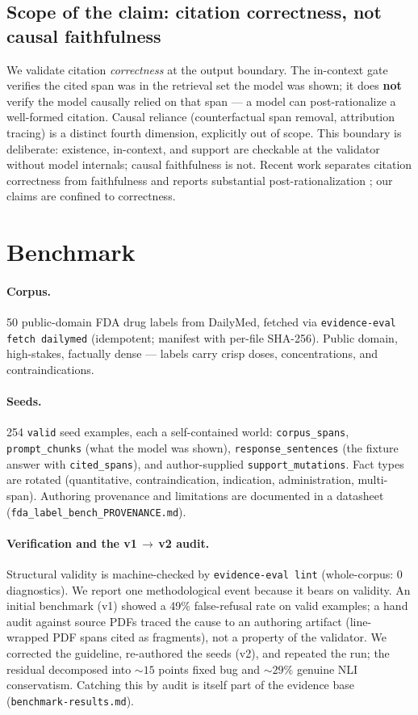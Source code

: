 \subsection*{Scope of the claim: citation correctness, not causal faithfulness}

We validate citation \emph{correctness} at the output boundary. The
in-context gate verifies the cited span was in the retrieval set the
model was shown; it does \textbf{not} verify the model causally relied
on that span --- a model can post-rationalize a well-formed citation.
Causal reliance (counterfactual span removal, attribution tracing) is
a distinct fourth dimension, explicitly out of scope. This boundary is
deliberate: existence, in-context, and support are checkable at the
validator without model internals; causal faithfulness is not. Recent
work separates citation correctness from faithfulness and reports
substantial post-rationalization \citep{wallat2024correctness}; our
claims are confined to correctness.

\section{Benchmark}
\label{sec:bench}

\paragraph{Corpus.}
50 public-domain FDA drug labels from DailyMed, fetched via
\texttt{evidence-eval fetch dailymed} (idempotent; manifest with
per-file SHA-256). Public domain, high-stakes, factually dense ---
labels carry crisp doses, concentrations, and contraindications.

\paragraph{Seeds.}
254 \texttt{valid} seed examples, each a self-contained world:
\texttt{corpus\_spans}, \texttt{prompt\_chunks} (what the model was
shown), \texttt{response\_sentences} (the fixture answer with
\texttt{cited\_spans}), and author-supplied
\texttt{support\_mutations}. Fact types are rotated (quantitative,
contraindication, indication, administration, multi-span). Authoring
provenance and limitations are documented in a datasheet
(\texttt{fda\_label\_bench\_PROVENANCE.md}).

\paragraph{Verification and the v1\,$\to$\,v2 audit.}
Structural validity is machine-checked by \texttt{evidence-eval lint}
(whole-corpus: 0 diagnostics). We report one methodological event
because it bears on validity. An initial benchmark (v1) showed a 49\%
false-refusal rate on valid examples; a hand audit against source PDFs
traced the cause to an authoring artifact (line-wrapped PDF spans
cited as fragments), not a property of the validator. We corrected the
guideline, re-authored the seeds (v2), and repeated the run; the
residual decomposed into ${\sim}15$ points fixed bug and ${\sim}29\%$
genuine NLI conservatism. Catching this by audit is itself part of the
evidence base (\texttt{benchmark-results.md}).

